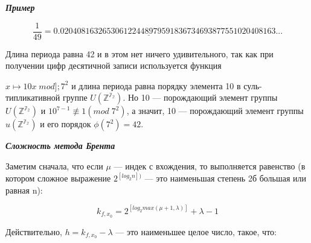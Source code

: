 \documentclass{../template/mai_book}
\begin{document}
\noindent\slshape{\textbf{Пример}} \par 
{} \par 
$$\frac{1}{49} = 0.\underline{020408163265306122448979591836734693877551}020408163...$$ \par 
\indent Длина периода равна 42 и в этом нет ничего удивительного, так как при \linebreak получении цифр десятичной записи используется функция \linebreak\newpage 


\noindent$x \mapsto 10x \; mod]; 7^{2}$ и длина периода равна порядку элемента 10 в суль- \linebreak типликативной группе $U(\mathbb{Z^{7_{2}}})$. Но 10 --- порождающий элемент \linebreak группы $U(\mathbb{Z^{7_{2}}})$ и $10^{7-1} \not\equiv 1 (mod \; 7^{2})$, а значит, 10 --- порождающий элемент \linebreak группы $u(\mathbb{Z^{7_{2}}})$ и его порядок $\phi(7^{2}) = 42$. \par 

\noindent\slshape{\textbf{Сложность метода Брента}} \par 
{} \par 
Заметим сначала, что если $\mu$  --- индек с вхождения, то выполняется \linebreak равенство (в котором сложное выражение $2^{[log_{2}n])}$ --- это наименьшая \linebreak степень 2б большая или равная n): \par 
$$k_{f,x_{0}} = 2^{[log_{2}max(\mu+1,\lambda)]} + \lambda - 1$$ \par 
\noindent Действительно, $h = k_{f,x_{0}} - \lambda$ --- это наименьшее целое число, такое, что: \par 
\end{document}

